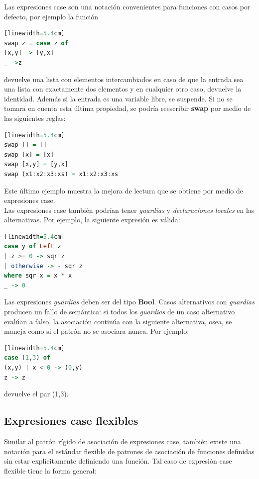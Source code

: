 \documentclass[10pt,journal,compsoc]{IEEEtran}
\begin{document}
Las expresiones case son una notaci\'on convenientes para funciones con casos por defecto, por ejemplo la funci\'on 

\begin{lstlisting}[language=Haskell, caption = {Otro ejemplo de una expresi\'on case}][linewidth=5.4cm]
swap z = case z of
[x,y] -> [y,x]
_ ->z
\end{lstlisting}
devuelve una lista con elementos intercambiados en caso de que la entrada sea una lista con exactamente dos elementos y en cualquier otro caso, devuelve la identidad. Adem\'as si la entrada es una variable libre, se suspende. Si no se tomara en cuenta esta \'ultima propiedad, se podr\'ia reescribir \textbf{swap} por medio de las siguientes reglas:

\begin{lstlisting}[language=Haskell, caption = {Redefinici\'on del ejemplo anterior}][linewidth=5.4cm]
swap [] = []
swap [x] = [x] 
swap [x,y] = [y,x]
swap (x1:x2:x3:xs) = x1:x2:x3:xs
\end{lstlisting}

Este \'ultimo ejemplo muestra la mejora de lectura que se obtiene por medio de expresiones case.\\
Las expresiones case tambi\'en podr\'ian tener \emph{guardias} y \emph{declaraciones locales} en las alternativas. Por ejemplo, la siguiente expresi\'on es v\'alida: 

\begin{lstlisting}[language=Haskell, caption = {Expresi\'on case con guardias y declaraciones locales}][linewidth=5.4cm]
case y of Left z
| z >= 0 -> sqr z
| otherwise -> - sqr z 
where sqr x = x * x
_ -> 0
\end{lstlisting}

Las expresiones \emph{guardias} deben ser del tipo \textbf{Bool}. Casos alternativos con \emph{guardias} producen un fallo de sem\'antica: si todos los \emph{guardias}  de un caso alternativo eval\'uan a falso, la asociaci\'on contin\'ua con la siguiente alternativa, osea, se maneja como si el patr\'on no se asociara nunca. Por ejemplo: 

\begin{lstlisting}[language=Haskell, caption = {Expresi\'on case sin asociaci\'on }][linewidth=5.4cm]
case (1,3) of
(x,y) | x < 0 -> (0,y) 
z -> z
\end{lstlisting}
devuelve el par (1,3).

\subsection{Expresiones case flexibles}
Similar al patr\'on r\'igido de asociaci\'on de expresiones case, tambi\'en existe una notaci\'on para el est\'andar flexible de patrones de asociaci\'on de funciones definidas sin estar expl\'icitamente definiendo una funci\'on. Tal caso de expresi\'on case flexible tiene la forma general: 
\end{document}

